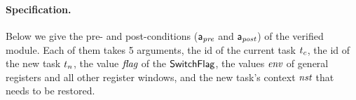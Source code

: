 
\paragraph{\textbf{Specification.}}
Below we give the pre- and post-conditions
($\mathsf{a}_{\textit{pre}}$ and $\mathsf{a}_{\textit{post}}$) of the verified module.
Each of them takes 5 arguments,
the id of the current task $t_c$, the id of the new
task $t_n$, the value $\textit{flag}$ of the $\mathsf{SwitchFlag}$,
the values $\textit{env}$ of general registers and all
other register windows, and the new task's context $\textit{nst}$
that needs to be restored.
